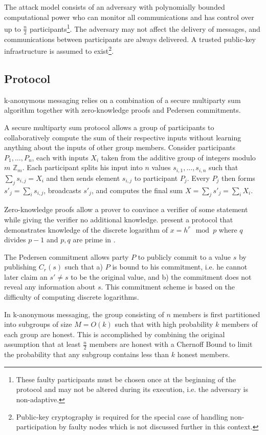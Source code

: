 The attack model consists of an adversary with polynomially bounded computational power
who can monitor all communications and
has control over up to $\frac{n}{2}$ participants\footnote{
These faulty participants must be chosen once at the beginning of the protocol and may not
be altered during its execution, i.e. the adversary is non-adaptive.}. The adversary may not affect
the delivery of messages, and communications between participants are always delivered.
A trusted public-key infrastructure is assumed to exist\footnote{Public-key cryptography is
required for the special case of handling non-participation by faulty nodes which is not discussed further
in this context.}.

\subsection{Protocol}

k-anonymous messaging relies on a combination of a secure multiparty sum algorithm
together with zero-knowledge proofs and Pedersen commitments.

A secure multiparty sum protocol allows a group of participants to collaboratively
compute the sum of their respective inputs without learning anything about the
inputs of other group members. Consider participants $P_1, \ldots, P_n$, each with
inputs $X_i$ taken from the additive group of integers modulo $m$ $\mathbb{Z}_m$.
Each participant splits his input into $n$ values $s_{i,1}, \ldots, s_{i,n}$ such that $\sum_j s_{i,j} = X_i$
and then sends element $s_{i,j}$ to participant $P_j$. Every $P_j$ then forms
$s'_j = \sum_i s_{i,j}$, broadcasts $s'_j$, and computes the final sum $X = \sum_j s'_j = \sum_i X_i$.

Zero-knowledge proofs allow a prover to convince a verifier of some statement while
giving the verifier no additional knowledge. \citeauthor{chaum1987demonstrating}
present a protocol that demonstrates knowledge of the discrete logarithm of $x = h^r \mod p$
where $q$ divides $p - 1$ and $p,q$ are prime in \cite{chaum1987demonstrating}.

The Pedersen commitment \cite{pedersen1992non} allows party $P$ to publicly commit
to a value $s$ by publishing $C_r(s)$ such that a) $P$ is bound to his commitment, i.e. he cannot later
claim an $s' \neq s$ to be the original value, and b) the commitment does not reveal
any information about $s$. This commitment scheme is based on the difficulty of computing discrete
logarithms.

In k-anonymous messaging, the group consisting of $n$ members is first partitioned
into subgroups of size $M = O(k)$ such that with high probability $k$ members of each group
are honest. This is accomplished by combining the original assumption that at least
$\frac{n}{2}$ members are honest with a Chernoff Bound to limit the probability that
any subgroup contains less than $k$ honest members.

